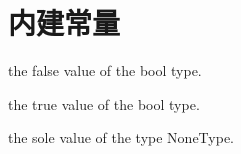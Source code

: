\chapter{内建常量}

\noindent{\color{red}{False:}}
\par{the false value of the bool type.}\\

\noindent{\color{red}{True:}}
\par{the true value of the bool type.}\\

\noindent{\color{red}{None:}}
\par{the sole value of the type NoneType.}\\


